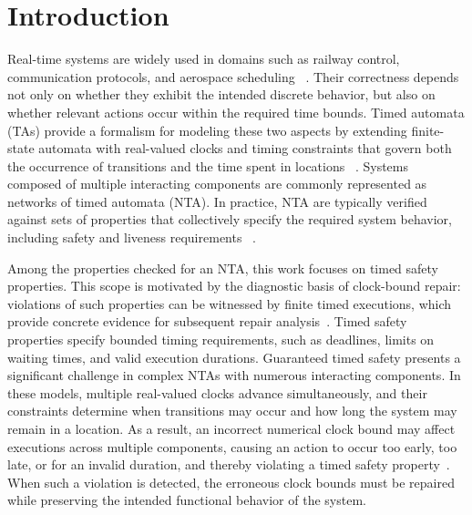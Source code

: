 ﻿\section{Introduction}
\label{sec:introduction}

Real-time systems are widely used in domains such as railway control,
communication protocols, and aerospace scheduling
~\cite{basile2021unisig,lonn1997tdma,david2010herschel}. Their
correctness depends not only on whether they exhibit the intended
discrete behavior, but also on whether relevant actions occur within the
required time bounds. Timed automata (TAs) provide a formalism for
modeling these two aspects by extending finite-state automata with
real-valued clocks and timing constraints that govern both the
occurrence of transitions and the time spent in locations
~\cite{alur1994theory,bengtsson2004timed}. Systems composed of multiple
interacting components are commonly represented as networks of timed
automata (NTA). In practice, NTA are typically verified against sets of
properties that collectively specify the required system behavior,
including safety and liveness requirements
~\cite{clarke2018handbook,vogel2022patterns}.

Among the properties checked for an NTA, this work focuses on timed
safety properties. This scope is motivated by the diagnostic basis of
clock-bound repair: violations of such properties can be witnessed by
finite timed executions, which provide concrete evidence for subsequent
repair analysis~\cite{kolbl2019clock,vogel2022patterns}. Timed safety
properties specify bounded timing requirements, such as deadlines,
limits on waiting times, and valid execution durations. Guaranteed
timed safety presents a significant challenge in complex NTAs with
numerous interacting components. In these models, multiple real-valued
clocks advance simultaneously, and their constraints determine when
transitions may occur and how long the system may remain in a location.
As a result, an incorrect numerical clock bound may affect executions
across multiple components, causing an action to occur too early, too
late, or for an invalid duration, and thereby violating a timed safety
property~\cite{kolbl2019clock,jiang2010heart,lonn1997tdma}. When such a
violation is detected, the erroneous clock bounds must be repaired
while preserving the intended functional behavior of the system.

